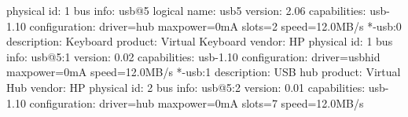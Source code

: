 \documentclass[mingoth,a4paper]{jsarticle}
\begin{document}
\begin{commandline}
                   physical id: 1
                   bus info: usb@5
                   logical name: usb5
                   version: 2.06
                   capabilities: usb-1.10
                   configuration: driver=hub maxpower=0mA slots=2 speed=12.0MB/s
                 *-usb:0
                      description: Keyboard
                      product: Virtual Keyboard
                      vendor: HP
                      physical id: 1
                      bus info: usb@5:1
                      version: 0.02
                      capabilities: usb-1.10
                      configuration: driver=usbhid maxpower=0mA speed=12.0MB/s
                 *-usb:1
                      description: USB hub
                      product: Virtual Hub
                      vendor: HP
                      physical id: 2
                      bus info: usb@5:2
                      version: 0.01
                      capabilities: usb-1.10
                      configuration: driver=hub maxpower=0mA slots=7 speed=12.0MB/s
\end{commandline}
\end{document}
